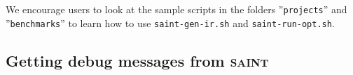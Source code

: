 \documentclass[12pt,onecolumn,a4paper]{article}
\begin{document}
We encourage users to look at the sample scripts in the
folders ''\texttt{projects}'' and ''\texttt{benchmarks}''
to learn how to use \texttt{saint-gen-ir.sh} and
\texttt{saint-run-opt.sh}.
		
\subsection{Getting debug messages from \textsc{saint}}		
		



\end{document}

